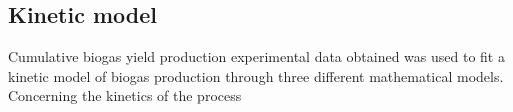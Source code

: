 \subsection{Kinetic model}
Cumulative biogas yield production experimental data obtained was used to fit a kinetic model of biogas production through three different mathematical models.
Concerning the kinetics of the process